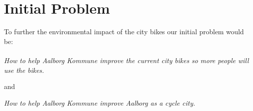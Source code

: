 \section*{Initial Problem}
To further the environmental impact of the city bikes our initial problem would be:\\\\
\textit{How to help Aalborg Kommune improve the current city bikes so more people will use the bikes.}
\begin{center}
and
\end{center}
\textit{How to help Aalborg Kommune improve Aalborg as a cycle city.}